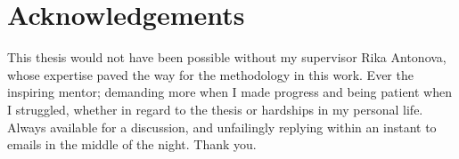 \documentclass{kththesis}
\begin{document}
\section*{Acknowledgements}

This thesis would not have been possible without my supervisor Rika Antonova, whose expertise paved the way for the methodology in this work. Ever the inspiring mentor; demanding more when I made progress and being patient when I struggled, whether in regard to the thesis or hardships in my personal life. Always available for a discussion, and unfailingly replying within an instant to emails in the middle of the night. Thank you.

\tableofcontents
\mainmatter







\printbibliography[heading=bibintoc]

\appendix

\tailmatter
\end{document}
